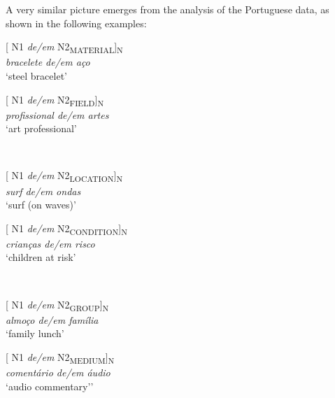 \documentclass[output=paper]{langsci/langscibook}
\begin{document}
A very similar picture emerges from the analysis of the Portuguese data, as shown in the following examples:


\begin{minipage}{0.4\textwidth}    %
[ N1 \textit{de/em} N2\textsubscript{MATERIAL}]\textsubscript{N}\\
\textit{bracelete de/em aço}\\
`steel bracelet'
\end{minipage}
\hfill            %
\begin{minipage}{0.4\textwidth}
[ N1 \textit{de/em} N2\textsubscript{FIELD}]\textsubscript{N}\\
\textit{profissional de/em artes}\\
`art professional'
\end{minipage} \\
\hfill  
\vspace{0.5cm}

\begin{minipage}{0.4\textwidth}    %
[ N1 \textit{de/em} N2\textsubscript{LOCATION}]\textsubscript{N}\\
\textit{surf de/em ondas }\\
`surf (on waves)'
\end{minipage}
\hfill            %
\begin{minipage}{0.4\textwidth}
[ N1 \textit{de/em} N2\textsubscript{CONDITION}]\textsubscript{N}\\
\textit{crianças de/em risco}\\
`children at risk'
\end{minipage} \\
\hfill
\vspace{0.5cm}

\begin{minipage}{0.4\textwidth}    %
[ N1 \textit{de/em} N2\textsubscript{GROUP}]\textsubscript{N}\\
\textit{almoço de/em família}\\
`family lunch'
\end{minipage}
\hfill            %
\begin{minipage}{0.4\textwidth}
[ N1 \textit{de/em} N2\textsubscript{MEDIUM}]\textsubscript{N}\\
\textit{comentário de/em áudio}\\
`audio commentary’'
\end{minipage} \\
\hfill
\vspace{0.5cm}
\end{document}
